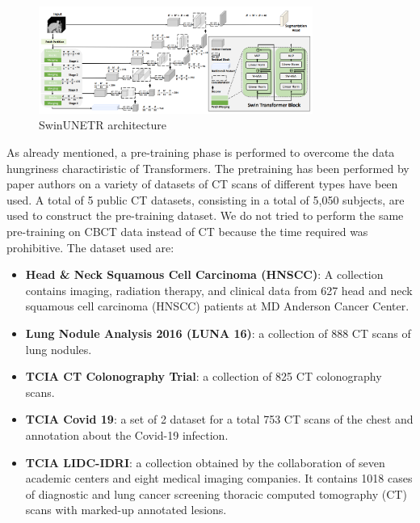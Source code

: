 \begin{figure}[ht!]
  \centering
  \includegraphics[width=0.8\textwidth]{Images/SwinUNETR.png}
  \caption{SwinUNETR architecture}
  \label{fig:swinunetr}
\end{figure}

As already mentioned, a pre-training phase is performed to overcome the data
hungriness charactiristic of Transformers. The pretraining has been performed by
paper authors on a variety of datasets of CT scans of different types have been
used. A total of 5 public CT datasets, consisting in a total of 5,050 subjects,
are used to construct the pre-training dataset. We do not tried to perform the
same pre-training on CBCT data instead of CT because the time required was
prohibitive.
The dataset used are:
\begin{itemize}
  \item{\textbf{Head \& Neck Squamous Cell Carcinoma (HNSCC)}: A collection
    contains imaging, radiation therapy, and clinical data from 627 head and
    neck squamous cell carcinoma (HNSCC) patients at MD Anderson Cancer Center.}
  \item{\textbf{Lung Nodule Analysis 2016 (LUNA 16)}: a collection of 888 CT
    scans of lung nodules.}
  \item{\textbf{TCIA CT Colonography Trial}: a collection of 825 CT colonography
    scans.}
  \item{\textbf{TCIA Covid 19}: a set of 2 dataset for a total 753 CT scans of
    the chest and annotation about the Covid-19 infection.}
  \item{\textbf{TCIA LIDC-IDRI}: a collection obtained by the collaboration of
    seven academic centers and eight medical imaging companies. It contains 1018
    cases of diagnostic and lung cancer screening thoracic computed tomography
    (CT) scans with marked-up annotated lesions.}
\end{itemize}

